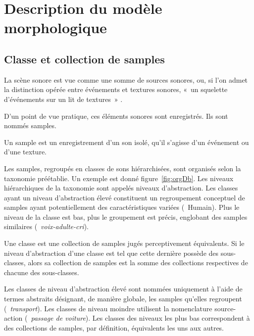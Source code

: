 \section{Description du modèle morphologique}
\label{sec:ch4_modelDes}

\subsection{Classe et collection de samples}
\label{sec:ch4_collecSons}

La scène sonore est vue comme une somme de sources sonores, ou, si l'on admet la distinction opérée entre événements et textures sonores, «~un squelette d'événements sur un lit de textures~» \citep{nelken2013ear}. 

D'un point de vue pratique, ces éléments sonores sont enregistrés. Ils sont nommés samples.
 
\begin{mydef}
Un sample est un enregistrement d'un son isolé, qu'il s'agisse d'un événement ou d'une texture.
\end{mydef}

Les samples, regroupés en classes de sons hiérarchisées, sont organisés selon la taxonomie préétablie. Un exemple est donné figure~\ref{fig:orgDb}. Les niveaux hiérarchiques de la taxonomie sont appelés niveaux d'abstraction. Les classes ayant un niveau d'abstraction élevé constituent un regroupement conceptuel de samples ayant potentiellement des caractéristiques variées (\eg~{Humain}). Plus le niveau de la classe est bas, plus le groupement est précis, englobant des samples similaires (\eg~\emph{voix-adulte-cri}). 

\begin{mydef}
Une classe est une collection de samples jugés perceptivement équivalents. Si le niveau d'abstraction d'une classe est tel que cette dernière possède des sous-classes, alors sa collection de samples est la somme des collections respectives de chacune des sous-classes.
\end{mydef}

Les classes de niveau d'abstraction élevé sont nommées uniquement à l'aide de termes abstraits désignant, de manière globale, les samples qu'elles regroupent (\eg~\emph{transport}). Les classes de niveau moindre utilisent la nomenclature source-action (\eg~\emph{passage de voiture}). Les classes des niveaux les plus bas correspondent à des collections de samples, par définition, équivalents les uns aux autres.

